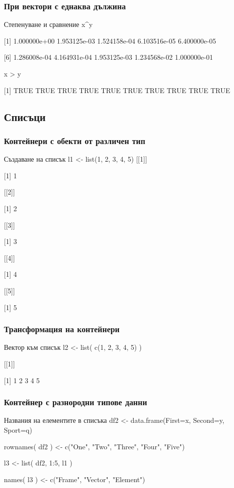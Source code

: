 \documentclass{beamer}
\begin{document}
\begin{frame}
\frametitle{При вектори с еднаква дължина}
\begin{block}{Степенуване и сравнение}
x\textasciicircum y

[1] 1.000000e+00 1.953125e-03 1.524158e-04 6.103516e-05 6.400000e-05

[6] 1.286008e-04 4.164931e-04 1.953125e-03 1.234568e-02 1.000000e-01

x > y

[1] TRUE TRUE TRUE TRUE TRUE TRUE TRUE TRUE TRUE TRUE
\end{block}
\end{frame}

\subsection{Списъци}

\begin{frame}
\frametitle{Контейнери с обекти от различен тип}
\begin{block}{Създаване на списък}
l1 <- list(1, 2, 3, 4, 5)
[[1]]

[1] 1

[[2]]

[1] 2

[[3]]

[1] 3

[[4]]

[1] 4

[[5]]

[1] 5
\end{block}
\end{frame}

\begin{frame}
\frametitle{Трансформация на контейнери}
\begin{block}{Вектор към списък}
l2 <- list( c(1, 2, 3, 4, 5) )

[[1]]

[1] 1 2 3 4 5
\end{block}
\end{frame}

\begin{frame}
\frametitle{Контейнер с разнородни типове данни}
\begin{block}{Названия на елементите в списъка}
df2 <- data.frame(First=x, Second=y, Sport=q)

rownames( df2 ) <- c("One", "Two", "Three", "Four", "Five")

l3 <- list( df2, 1:5, l1 )

names( l3 ) <- c("Frame", "Vector", "Element")
\end{block}
\end{frame}
\end{document}
